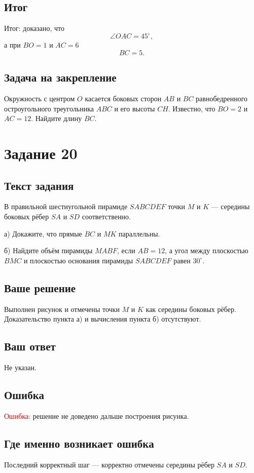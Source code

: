 \documentclass[12pt,a4paper]{article}
\begin{document}
\subsection*{Итог}
\textcolor{teal!60!black}{Итог:} доказано, что
\[
\angle OAC=45^\circ,
\]
а при $BO=1$ и $AC=6$
\[
BC=5.
\]

\subsection*{Задача на закрепление}
Окружность с центром $O$ касается боковых сторон $AB$ и $BC$ равнобедренного остроугольного треугольника $ABC$ и его высоты $CH$. Известно, что $BO=2$ и $AC=12$. Найдите длину $BC$.

\newpage
{}\label{task:20}
\section*{Задание 20}

\subsection*{Текст задания}
В правильной шестиугольной пирамиде $SABCDEF$ точки $M$ и $K$ --- середины боковых рёбер $SA$ и $SD$ соответственно.

а) Докажите, что прямые $BC$ и $MK$ параллельны.

б) Найдите объём пирамиды $MABF$, если $AB=12$, а угол между плоскостью $BMC$ и плоскостью основания пирамиды $SABCDEF$ равен $30^\circ$.

\subsection*{Ваше решение}
Выполнен рисунок и отмечены точки $M$ и $K$ как середины боковых рёбер. Доказательство пункта а) и вычисления пункта б) отсутствуют.

\subsection*{Ваш ответ}
Не указан.

\subsection*{Ошибка}
\textcolor{red}{Ошибка:} решение не доведено дальше построения рисунка.

\subsection*{Где именно возникает ошибка}
Последний корректный шаг --- корректно отмечены середины рёбер $SA$ и $SD$.
\end{document}
